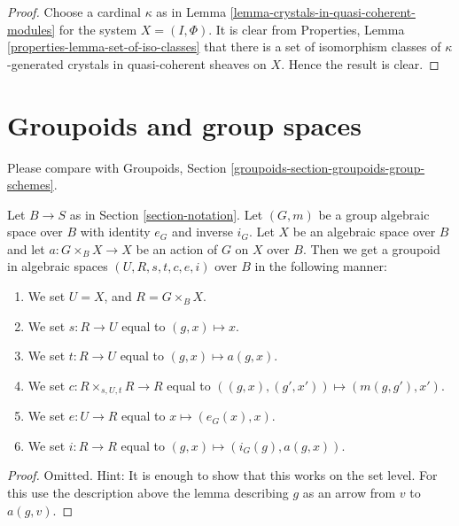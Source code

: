 \begin{proof}
\medskip\noindent
Choose a cardinal $\kappa$ as in
Lemma \ref{lemma-crystals-in-quasi-coherent-modules}
for the system $X = (I, \Phi)$. It is clear from
Properties, Lemma \ref{properties-lemma-set-of-iso-classes}
that there is a set of isomorphism classes of $\kappa$-generated
crystals in quasi-coherent sheaves on $X$.
Hence the result is clear.
\end{proof}









\section{Groupoids and group spaces}
\label{section-groupoids-group-spaces}

\noindent
Please compare with
Groupoids, Section \ref{groupoids-section-groupoids-group-schemes}.

\begin{lemma}
\label{lemma-groupoid-from-action}
Let $B \to S$ as in Section \ref{section-notation}.
Let $(G, m)$ be a group algebraic space over $B$ with
identity $e_G$ and inverse $i_G$.
Let $X$ be an algebraic space over $B$ and let $a : G \times_B X \to X$
be an action of $G$ on $X$ over $B$.
Then we get a groupoid in algebraic spaces $(U, R, s, t, c, e, i)$ over $B$
in the following manner:
\begin{enumerate}
\item We set $U = X$, and $R = G \times_B X$.
\item We set $s : R \to U$ equal to $(g, x) \mapsto x$.
\item We set $t : R \to U$ equal to $(g, x) \mapsto a(g, x)$.
\item We set $c : R \times_{s, U, t} R \to R$ equal to
$((g, x), (g', x')) \mapsto (m(g, g'), x')$.
\item We set $e : U \to R$ equal to $x \mapsto (e_G(x), x)$.
\item We set $i : R \to R$ equal to $(g, x) \mapsto (i_G(g), a(g, x))$.
\end{enumerate}
\end{lemma}

\begin{proof}
Omitted. Hint: It is enough to show that this works on the set
level. For this use the description above the lemma describing
$g$ as an arrow from $v$ to $a(g, v)$.
\end{proof}


